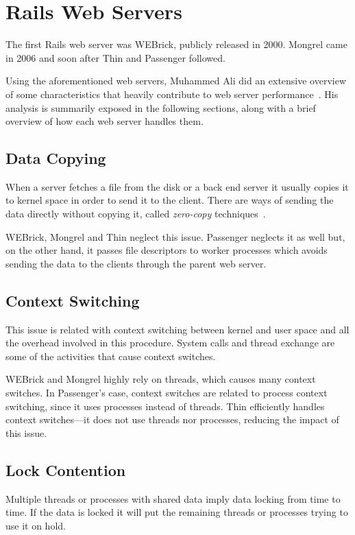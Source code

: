 \section{Rails Web Servers} %
\label{state:sec:rails_web_servers}
The first Rails web server was WEBrick, publicly released in 2000. Mongrel came in 2006 and soon after Thin and Passenger followed.

Using the aforementioned web servers, Muhammed Ali did an extensive overview of some characteristics that heavily contribute to web server performance~\cite{ruby_webservers}. His analysis is summarily exposed in the following sections, along with a brief overview of how each web server handles them.

\subsection{Data Copying}
When a server fetches a file from the disk or a back end server it usually copies it to kernel space in order to send it to the client. There are ways of sending the data directly without copying it, called \textit{zero-copy} techniques~\cite{ zero-copy_data_transfer}.

WEBrick, Mongrel and Thin neglect this issue. Passenger neglects it as well but, on the other hand, it passes file descriptors to worker processes which avoids sending the data to the clients through the parent web server.

\subsection{Context Switching}
This issue is related with context switching between kernel and user space and all the overhead involved in this procedure. System calls and thread exchange are some of the activities that cause context switches.

WEBrick and Mongrel highly rely on threads, which causes many context switches. In Passenger's case, context switches are related to process context switching, since it uses processes instead of threads. Thin efficiently handles context switches---it does not use threads nor processes, reducing the impact of this issue.

\subsection{Lock Contention} 
Multiple threads or processes with shared data imply data locking from time to time. If the data is locked it will put the remaining threads or processes trying to use it on hold.

